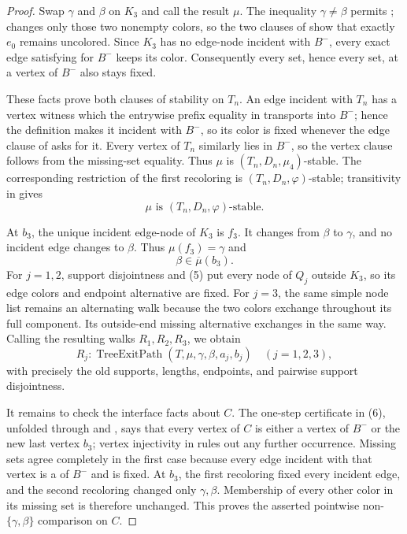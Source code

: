 \begin{proof}
Swap $\gamma$ and $\beta$ on $K_3$ and call the result $\mu$.
The inequality $\gamma\ne\beta$ permits
;
 changes only those two nonempty colors,
so the two clauses of  show that exactly
$e_0$ remains uncolored.  Since $K_3$ has no edge-node incident with
$B^-$, every exact edge satisfying  for
$B^-$ keeps its color.  Consequently every 
set, hence every  set, at a vertex of $B^-$ also
stays fixed.

These facts prove both clauses of stability on $T_n$.  An edge incident
with $T_n$ has a vertex witness which the entrywise prefix equality in
 transports into $B^-$; hence the
definition  makes it incident with $B^-$, so
its color is fixed whenever the edge clause of
 asks for it.  Every vertex of $T_n$ similarly
lies in $B^-$, so the vertex clause follows from the missing-set
equality.  Thus $\mu$ is $(T_n,D_n,\mu_4)$-stable.  The corresponding
restriction of the first recoloring is
$(T_n,D_n,\varphi)$-stable; transitivity in  gives
\[
             \mu\text{ is }(T_n,D_n,\varphi)\text{-stable}.   \tag{8}
\]

At $b_3$, the unique incident edge-node of $K_3$ is $f_3$.  It changes
from $\beta$ to $\gamma$, and no incident edge changes to $\beta$.
Thus $\mu(f_3)=\gamma$ and
\[
                         \beta\in\overline\mu(b_3).           \tag{9}
\]
For $j=1,2$, support disjointness and (5) put every node of $Q_j$
outside $K_3$, so its edge colors and endpoint alternative are fixed.
For $j=3$, the same simple node list remains an alternating walk because
the two colors exchange throughout its full component.  Its outside-end
missing alternative exchanges in the same way.  Calling the resulting
walks $R_1,R_2,R_3$, we obtain
\[
 R_j:\operatorname{TreeExitPath}(T,\mu,\gamma,\beta,a_j,b_j)
 \quad(j=1,2,3),                                              \tag{10}
\]
with precisely the old supports, lengths, endpoints, and pairwise
support disjointness.

It remains to check the interface facts about $C$.  The one-step
certificate in (6), unfolded through
 and
, says that every vertex of $C$ is
either a vertex of $B^-$ or the new last vertex $b_3$; vertex
injectivity in  rules out any further occurrence.
Missing sets agree completely in the first case because every edge
incident with that vertex is a  of $B^-$ and
is fixed.  At $b_3$, the first recoloring fixed every incident edge, and
the second recoloring changed only $\gamma,\beta$.  Membership of every
other color in its missing set is therefore unchanged.  This proves the
asserted pointwise non-$\{\gamma,\beta\}$ comparison on $C$.


\end{proof}
